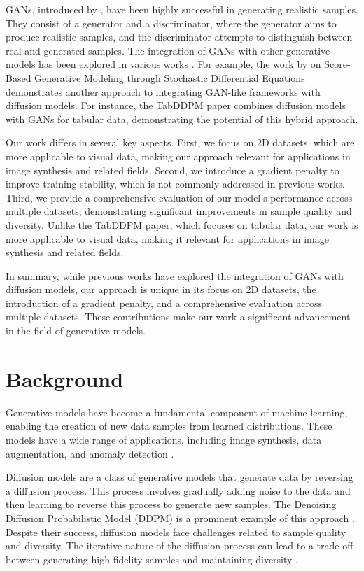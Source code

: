 \documentclass{article} %
\begin{document}
GANs, introduced by \citet{gan}, have been highly successful in generating realistic samples. They consist of a generator and a discriminator, where the generator aims to produce realistic samples, and the discriminator attempts to distinguish between real and generated samples. The integration of GANs with other generative models has been explored in various works \citep{Tiago2024ADT}. For example, the work by \citet{Song2020ScoreBasedGM} on Score-Based Generative Modeling through Stochastic Differential Equations demonstrates another approach to integrating GAN-like frameworks with diffusion models. For instance, the TabDDPM \citep{kotelnikov2022tabddpm} paper combines diffusion models with GANs for tabular data, demonstrating the potential of this hybrid approach. 

Our work differs in several key aspects. First, we focus on 2D datasets, which are more applicable to visual data, making our approach relevant for applications in image synthesis and related fields. Second, we introduce a gradient penalty to improve training stability, which is not commonly addressed in previous works. Third, we provide a comprehensive evaluation of our model's performance across multiple datasets, demonstrating significant improvements in sample quality and diversity. Unlike the TabDDPM \citep{kotelnikov2022tabddpm} paper, which focuses on tabular data, our work is more applicable to visual data, making it relevant for applications in image synthesis and related fields.

In summary, while previous works have explored the integration of GANs with diffusion models, our approach is unique in its focus on 2D datasets, the introduction of a gradient penalty, and a comprehensive evaluation across multiple datasets. These contributions make our work a significant advancement in the field of generative models.

\section{Background}
\label{sec:background}

Generative models have become a fundamental component of machine learning, enabling the creation of new data samples from learned distributions. These models have a wide range of applications, including image synthesis, data augmentation, and anomaly detection \citep{goodfellow2016deep}.

Diffusion models are a class of generative models that generate data by reversing a diffusion process. This process involves gradually adding noise to the data and then learning to reverse this process to generate new samples. The Denoising Diffusion Probabilistic Model (DDPM) is a prominent example of this approach \citep{ddpm}. Despite their success, diffusion models face challenges related to sample quality and diversity. The iterative nature of the diffusion process can lead to a trade-off between generating high-fidelity samples and maintaining diversity \citep{yang2023diffusion}.
\end{document}
